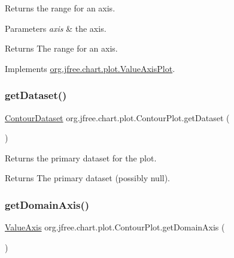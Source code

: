 Returns the range for an axis.


\begin{DoxyParams}{Parameters}
{\em axis} & the axis.\\
\hline
\end{DoxyParams}
\begin{DoxyReturn}{Returns}
The range for an axis. 
\end{DoxyReturn}


Implements \mbox{\hyperlink{interfaceorg_1_1jfree_1_1chart_1_1plot_1_1_value_axis_plot_a54815b2f078c11b2618804fe3e7e5353}{org.\+jfree.\+chart.\+plot.\+Value\+Axis\+Plot}}.

\mbox{\label{classorg_1_1jfree_1_1chart_1_1plot_1_1_contour_plot_af21c24017cbe00a61aada7c01acf2d54}} 
\subsubsection{\texorpdfstring{get\+Dataset()}{getDataset()}}
{\footnotesize\ttfamily \mbox{\hyperlink{interfaceorg_1_1jfree_1_1data_1_1contour_1_1_contour_dataset}{Contour\+Dataset}} org.\+jfree.\+chart.\+plot.\+Contour\+Plot.\+get\+Dataset (\begin{DoxyParamCaption}{ }\end{DoxyParamCaption})}

Returns the primary dataset for the plot.

\begin{DoxyReturn}{Returns}
The primary dataset (possibly {\ttfamily null}). 
\end{DoxyReturn}
\mbox{\label{classorg_1_1jfree_1_1chart_1_1plot_1_1_contour_plot_a3c7c415dc8cce64e5c967ec463bf37f7}} 
\subsubsection{\texorpdfstring{get\+Domain\+Axis()}{getDomainAxis()}}
{\footnotesize\ttfamily \mbox{\hyperlink{classorg_1_1jfree_1_1chart_1_1axis_1_1_value_axis}{Value\+Axis}} org.\+jfree.\+chart.\+plot.\+Contour\+Plot.\+get\+Domain\+Axis (\begin{DoxyParamCaption}{ }\end{DoxyParamCaption})}

